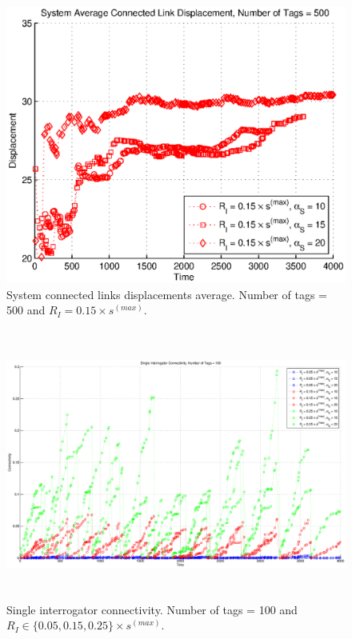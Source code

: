 \begin{figure}
\centering
\includegraphics[width=5in]{Chapter_4_Figures/sys_links_disp_500tags_15diam.eps}
\caption{System connected links displacements average. Number of tags = 500 and $R_I = 0.15 \times s^{(max)}$.}
\label{Figure: sys_links_disp_500tags_15diam.eps}
\end{figure}
\begin{figure}
\centering
\includegraphics[width=5in, height=3.5in]{Chapter_4_Figures/sin_connect_100tags_all.eps}
\caption{Single interrogator connectivity. Number of tags = 100 and $R_I \in \{0.05, 0.15, 0.25\} \times s^{(max)}$.}
\label{Figure: sin_connect_100tags_all.eps}
\end{figure}
\clearpage

